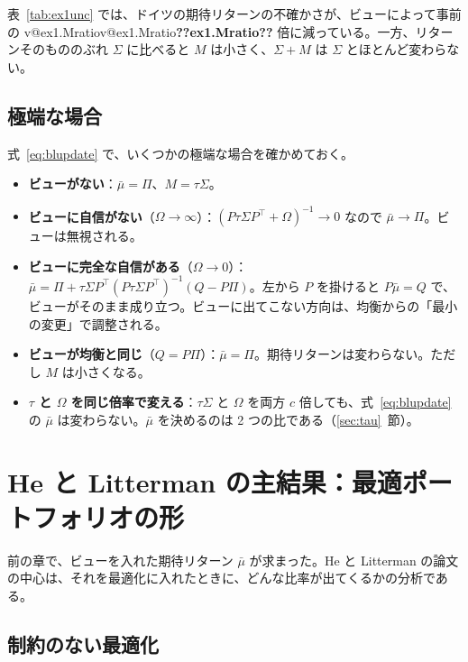 \documentclass[xelatex,ja=standard,jafont=hiragino-pron,a4paper,11pt,openany]{bxjsreport}
\makeatletter
\newcommand{\V}[1]{\ifcsname v@#1\endcsname\csname v@#1\endcsname\else\textbf{??#1??}\fi}
\newcommand{\tabin}[1]{\adjustbox{max width=\linewidth}{}}
\newcommand{\T}{^{\top}}
\newcommand{\mub}{\bar{\mu}}
\newcommand{\tabref}[1]{表~\ref{#1}}
\newcommand{\secref}[1]{\ref{#1}~節}
\makeatother
\begin{document}
\begin{table}[htbp]
\centering
\caption{例 1 の不確かさ（標準偏差、年率 \%）。ビューで $\mu$ の不確かさは減るが、$\Sigma + M$ に対しては小さな違いである。}
\label{tab:ex1unc}
\small\tabin{ex1_unc}
\end{table}

\tabref{tab:ex1unc} では、ドイツの期待リターンの不確かさが、ビューによって事前の \V{ex1.Mratio} 倍に減っている。一方、リターンそのもののぶれ $\Sigma$ に比べると $M$ は小さく、$\Sigma + M$ は $\Sigma$ とほとんど変わらない。

\section{極端な場合}

式~\eqref{eq:blupdate} で、いくつかの極端な場合を確かめておく。

\begin{itemize}
\item \textbf{ビューがない}：$\mub = \Pi$、$M = \tau\Sigma$。
\item \textbf{ビューに自信がない}（$\Omega \to \infty$）：$(P\tau\Sigma P\T + \Omega)^{-1} \to 0$ なので $\mub \to \Pi$。ビューは無視される。
\item \textbf{ビューに完全な自信がある}（$\Omega \to 0$）：$\mub = \Pi + \tau\Sigma P\T(P\tau\Sigma P\T)^{-1}(Q - P\Pi)$。左から $P$ を掛けると $P\mub = Q$ で、ビューがそのまま成り立つ。ビューに出てこない方向は、均衡からの「最小の変更」で調整される。
\item \textbf{ビューが均衡と同じ}（$Q = P\Pi$）：$\mub = \Pi$。期待リターンは変わらない。ただし $M$ は小さくなる。
\item \textbf{$\tau$ と $\Omega$ を同じ倍率で変える}：$\tau\Sigma$ と $\Omega$ を両方 $c$ 倍しても、式~\eqref{eq:blupdate} の $\mub$ は変わらない。$\mub$ を決めるのは 2 つの比である（\secref{sec:tau}）。
\end{itemize}

\chapter{He と Litterman の主結果：最適ポートフォリオの形}\label{ch:hl}

前の章で、ビューを入れた期待リターン $\mub$ が求まった。He と Litterman の論文の中心は、それを最適化に入れたときに、どんな比率が出てくるかの分析である。

\section{制約のない最適化}
\end{document}
